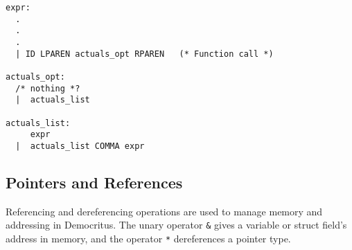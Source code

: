     \begin{verbatim}
expr:
  .
  .
  .
  | ID LPAREN actuals_opt RPAREN   (* Function call *)

actuals_opt:
  /* nothing *?   
  |  actuals_list 

actuals_list:
     expr        
  |  actuals_list COMMA expr 
    \end{verbatim}


  \subsection{Pointers and References}
		Referencing and dereferencing operations are used to manage memory and addressing in Democritus. The unary operator \texttt{\&} gives a variable or struct field's address in memory, and the operator \texttt{*} dereferences a pointer type.
	
  \iffalse
	\subsection{Array access}
		Array access is done with \texttt{[\textit{i}]} where \textit{i} is the index being accessed. 
  \fi

